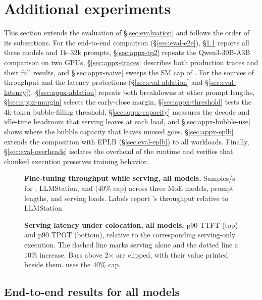 \section{Additional experiments}
\label{sec:appx-experiments}

This section extends the evaluation of \S\ref{sec:evaluation} and
follows the order of its subsections.
For the end-to-end comparison (\S\ref{sec:eval-e2e}),
\S\ref{sec:appx-e2e} reports all three models and 1k--32k prompts,
\S\ref{sec:appx-tp2} repeats the Qwen3-30B-A3B comparison on two GPUs,
\S\ref{sec:appx-traces} describes both production traces and their full
results, and \S\ref{sec:appx-naive} sweeps the \ac{SM} cap of \uncoord.
For the sources of throughput and the latency protections
(\S\ref{sec:eval-ablation} and \S\ref{sec:eval-latency}),
\S\ref{sec:appx-ablation} repeats both breakdowns at other prompt
lengths, \S\ref{sec:appx-margin} selects the early-close margin,
\S\ref{sec:appx-threshold} tests the 4k-token bubble-filling threshold,
\S\ref{sec:appx-capacity} measures the decode and idle-time headroom
that serving leaves at each load, and \S\ref{sec:appx-bubble-use} shows
where the bubble capacity that \sys{} leaves unused goes.
\S\ref{sec:appx-eplb} extends the composition with \ac{EPLB}
(\S\ref{sec:eval-eplb}) to all workloads. Finally,
\S\ref{sec:eval-overheads} isolates the overhead of the \sys{} runtime
and verifies that chunked execution preserves training behavior.

\begin{figure}[t]
  \centering
  \caption{\textbf{Fine-tuning throughput while serving, all models.}
    Samples/s for \sys{}, LLMStation, and \uncoord (40\% cap)
    across three \ac{MoE} models, prompt lengths, and serving loads.
    Labels report \sys{}'s throughput relative to LLMStation.}
  \label{fig:appx-e2e-tput}
\end{figure}

\begin{figure}[t]
  \centering
  \caption{\textbf{Serving latency under colocation, all models.}
    p90 \ac{TTFT} (top) and p90 \ac{TPOT} (bottom), relative to the
    corresponding serving-only execution. The dashed line marks serving
    alone and the dotted line a 10\% increase. Bars above 2$\times$ are
    clipped, with their value printed beside them. \Uncoord uses
    the 40\% cap.}
  \label{fig:appx-e2e-lat}
\end{figure}

\subsection{End-to-end results for all models}
\label{sec:appx-e2e}

